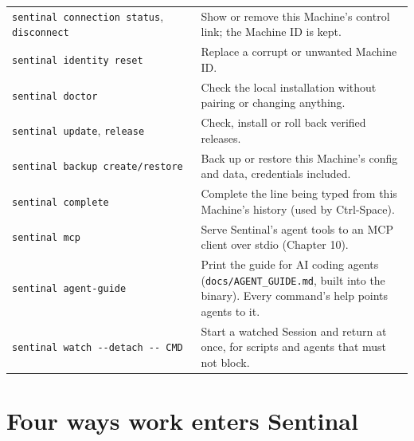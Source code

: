 \begin{small}
\begin{longtable}{>{\raggedright\arraybackslash}p{0.373\dimexpr \linewidth-4\tabcolsep\relax}>{\raggedright\arraybackslash}p{0.627\dimexpr \linewidth-4\tabcolsep\relax}}
\texttt{sentinal\ connection\ status}, \texttt{disconnect} & Show or remove this Machine's control link; the Machine ID is kept. \\
\texttt{sentinal\ identity\ reset} & Replace a corrupt or unwanted Machine ID. \\
\texttt{sentinal\ doctor} & Check the local installation without pairing or changing anything. \\
\texttt{sentinal\ update}, \texttt{release} & Check, install or roll back verified releases. \\
\texttt{sentinal\ backup\ create/\allowbreak{}restore} & Back up or restore this Machine's config and data, credentials included. \\
\texttt{sentinal\ complete} & Complete the line being typed from this Machine's history (used by Ctrl-Space). \\
\texttt{sentinal\ mcp} & Serve Sentinal's agent tools to an MCP client over stdio (Chapter 10). \\
\texttt{sentinal\ agent-{}\allowbreak{}guide} & Print the guide for AI coding agents (\texttt{docs/\allowbreak{}AGENT\_\allowbreak{}GUIDE.\allowbreak{}md}, built into the binary). Every command's help points agents to it. \\
\texttt{sentinal\ watch\ -{}\allowbreak{}-{}\allowbreak{}detach\ -{}\allowbreak{}-{}\allowbreak{}\ CMD} & Start a watched Session and return at once, for scripts and agents that must not block. \\
\bottomrule
\end{longtable}
\end{small}

\section{\texorpdfstring{Four ways work enters Sentinal}{Four ways work enters Sentinal}}

